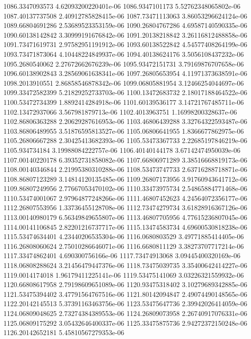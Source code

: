 {1086.3347093573 4.62093200220401e-06
1086.9347101173 5.52762348065802e-06
1087.40137737508 2.40912785828415e-06
1087.73471113063 3.86053296624124e-06
1089.66804691286 2.53689523353159e-06
1090.26804767286 4.69587140590335e-06
1090.60138142842 3.30999191676842e-06
1091.20138218842 3.26116812488858e-06
1091.73471619731 2.97582951191912e-06
1093.60138522842 4.54577408264199e-06
1093.73471873064 4.10448224849937e-06
1094.40138624176 3.5056108437232e-06
1095.2680540062 2.27672662676239e-06
1095.93472151731 3.79169876707658e-06
1096.60138902843 3.28569061638341e-06
1097.26805653954 4.11971373638591e-06
1098.2013910551 2.86858546878342e-06
1099.06805881954 3.12466254044697e-06
1099.33472582399 5.21829252733703e-06
1100.13472683732 2.18017188464522e-06
1100.53472734399 1.8892414284918e-06
1101.60139536177 3.14721767485711e-06
1102.13472937066 3.567981879713e-06
1102.4013963751 1.16998200328637e-06
1102.86806363288 2.20629287616953e-06
1103.46806439288 3.32764322593487e-06
1103.86806489955 3.51876595813527e-06
1105.06806641955 1.8366677862975e-06
1105.26806667288 2.30425413682393e-06
1105.53473367733 2.22685197846219e-06
1105.934734184 3.19988084222757e-06
1106.40140144178 3.67142474950039e-06
1107.00140220178 6.39352731858082e-06
1107.66806971289 3.38516668819173e-06
1108.00140346844 2.21995380310288e-06
1108.53473747733 2.63716288718871e-06
1108.86807123289 3.14814120135485e-06
1109.26807173956 3.91760943641712e-06
1109.86807249956 2.77667053470102e-06
1110.33473975734 2.54865884771468e-06
1110.53474001067 2.97964877248266e-06
1111.46807452623 4.24564072356177e-06
1112.26807553956 1.33736455128708e-06
1112.73474279734 3.61828916367126e-06
1113.00140980179 6.56349849655807e-06
1113.46807705956 4.77615236807045e-06
1114.00141106845 2.82201216737717e-06
1115.13474583734 4.69600530818238e-06
1115.53474634401 4.23440206535304e-06
1116.0680803529 3.49771885414405e-06
1116.26808060624 2.75010286646071e-06
1116.6680811129 3.38273707717214e-06
1117.33474862401 4.690300756166e-06
1117.73474913068 3.09445400320169e-06
1118.06808288624 3.21456479447376e-06
1118.73475039735 3.35400642414227e-06
1119.0014174018 1.96179411225141e-06
1119.53475141069 3.03226321559932e-06
1120.66808617958 2.79198609651089e-06
1120.93475318402 3.10279689342885e-06
1121.53475394402 3.47791564767516e-06
1121.80142094847 2.49074490148565e-06
1122.20142145513 5.37391163463756e-06
1123.53475647736 2.39942026414059e-06
1124.06809048625 2.73274384389553e-06
1124.26809073958 2.26740917076331e-06
1125.06809175292 3.05432646400337e-06
1125.33475875736 2.94272372150248e-06
1126.20142652181 5.45810567279353e-06
}
